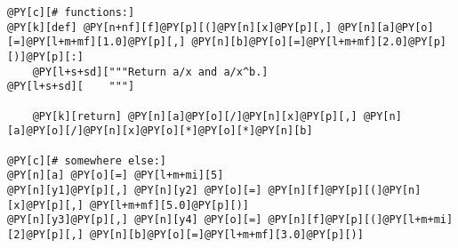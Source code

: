 \begin{Verbatim}[commandchars=@\[\]]
@PY[c][# functions:]
@PY[k][def] @PY[n+nf][f]@PY[p][(]@PY[n][x]@PY[p][,] @PY[n][a]@PY[o][=]@PY[l+m+mf][1.0]@PY[p][,] @PY[n][b]@PY[o][=]@PY[l+m+mf][2.0]@PY[p][)]@PY[p][:]
    @PY[l+s+sd]["""Return a/x and a/x^b.]
@PY[l+s+sd][    """]

    @PY[k][return] @PY[n][a]@PY[o][/]@PY[n][x]@PY[p][,] @PY[n][a]@PY[o][/]@PY[n][x]@PY[o][*]@PY[o][*]@PY[n][b]

@PY[c][# somewhere else:]
@PY[n][a] @PY[o][=] @PY[l+m+mi][5]
@PY[n][y1]@PY[p][,] @PY[n][y2] @PY[o][=] @PY[n][f]@PY[p][(]@PY[n][x]@PY[p][,] @PY[l+m+mf][5.0]@PY[p][)]
@PY[n][y3]@PY[p][,] @PY[n][y4] @PY[o][=] @PY[n][f]@PY[p][(]@PY[l+m+mi][2]@PY[p][,] @PY[n][b]@PY[o][=]@PY[l+m+mf][3.0]@PY[p][)]
\end{Verbatim}
